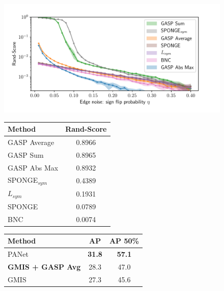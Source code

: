 \documentclass{article}
\newcommand*{\algname}{GASP}
\begin{document}
\begin{figure}[t]
\captionsetup{font=small}
        \centering
\begin{minipage}[b]{0.38\textwidth}
\centering
        \includegraphics[width=\textwidth,trim=0.25in 0.25in 0.68in 0.36in,clip]{./SSBM_experiments.pdf}
    \label{fig:SSBM_experiments}
\end{minipage}\hfill
\begin{minipage}[b]{0.25\textwidth}
\centering
    \scriptsize
\begin{tabular}{l|c}
           Method & Rand-Score \\ \midrule
           GASP Average & 0.8966 \\
GASP Sum & 0.8965 \\
GASP Abs Max & 0.8932 \\
SPONGE$_{sym}$ \cite{Cucuringu2019SPONGEAG} & 0.4389\\
$L_{sym}$ \cite{kunegis2010spectral} & 0.1931 \\
SPONGE \cite{Cucuringu2019SPONGEAG} & 0.0789 \\
BNC \cite{chiang2012scalable} & 0.0074 \\
        \end{tabular}
    \label{tab:cremi_experiments}
\end{minipage}\hfill
\begin{minipage}[b]{0.30\textwidth}
\centering
    \scriptsize
\begin{tabular}{l|cc}
           Method & AP  & AP 50\% \\ \midrule
           PANet \cite{liu2018path} & \textbf{31.8} & \textbf{57.1} \\
           \textbf{GMIS + \algname{} Avg} & 28.3 & 47.0 \\ 
           GMIS & 27.3 & 45.6 \\

\end{tabular}
\end{minipage}
\end{figure}
\end{document}
